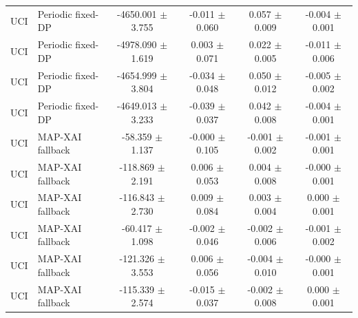 \begin{tabular}{llcccc}
UCI & Periodic fixed-DP & -4650.001 $\pm$ 3.755 & -0.011 $\pm$ 0.060 & 0.057 $\pm$ 0.009 & -0.004 $\pm$ 0.001 \\
UCI & Periodic fixed-DP & -4978.090 $\pm$ 1.619 & 0.003 $\pm$ 0.071 & 0.022 $\pm$ 0.005 & -0.011 $\pm$ 0.006 \\
UCI & Periodic fixed-DP & -4654.999 $\pm$ 3.804 & -0.034 $\pm$ 0.048 & 0.050 $\pm$ 0.012 & -0.005 $\pm$ 0.002 \\
UCI & Periodic fixed-DP & -4649.013 $\pm$ 3.233 & -0.039 $\pm$ 0.037 & 0.042 $\pm$ 0.008 & -0.004 $\pm$ 0.001 \\
UCI & MAP-XAI fallback & -58.359 $\pm$ 1.137 & -0.000 $\pm$ 0.105 & -0.001 $\pm$ 0.002 & -0.001 $\pm$ 0.001 \\
UCI & MAP-XAI fallback & -118.869 $\pm$ 2.191 & 0.006 $\pm$ 0.053 & 0.004 $\pm$ 0.008 & -0.000 $\pm$ 0.001 \\
UCI & MAP-XAI fallback & -116.843 $\pm$ 2.730 & 0.009 $\pm$ 0.084 & 0.003 $\pm$ 0.004 & 0.000 $\pm$ 0.001 \\
UCI & MAP-XAI fallback & -60.417 $\pm$ 1.098 & -0.002 $\pm$ 0.046 & -0.002 $\pm$ 0.006 & -0.001 $\pm$ 0.002 \\
UCI & MAP-XAI fallback & -121.326 $\pm$ 3.553 & 0.006 $\pm$ 0.056 & -0.004 $\pm$ 0.010 & -0.000 $\pm$ 0.001 \\
UCI & MAP-XAI fallback & -115.339 $\pm$ 2.574 & -0.015 $\pm$ 0.037 & -0.002 $\pm$ 0.008 & 0.000 $\pm$ 0.001 \\
\bottomrule
\end{tabular}

